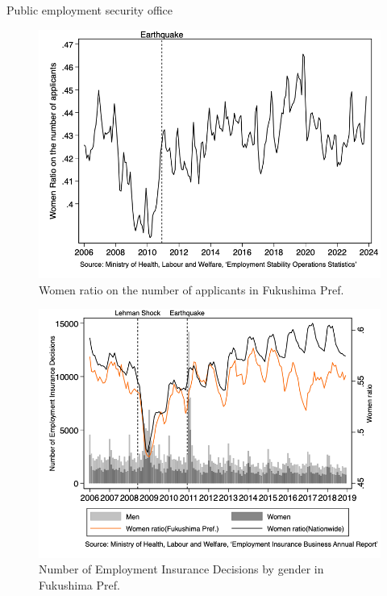\documentclass[12pt,halfline,a4paper]{ouparticle}
\begin{document}
Public employment security office 

\begin{figure}
\includegraphics[width=\textwidth]{Women ratio on the number of applicants in Fukushima.png}
\caption{Women ratio on the number of applicants in Fukushima Pref.} \label{Women ratio on the number of applicants in Fukushima.png}
\end{figure}



\begin{figure}
\includegraphics[width=\textwidth]{Number of Employment Insurance Decisions_2.png}
\caption{Number of Employment Insurance Decisions by gender in Fukushima Pref.} \label{Number of Employment Insurance Decisions_2.png}
\end{figure}
\end{document}

